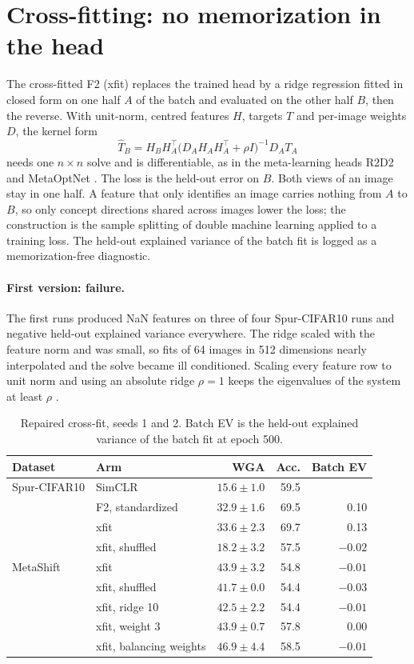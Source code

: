 \documentclass{article}
\begin{document}
\section{Cross-fitting: no memorization in the head}
\label{sec:xfit}

The cross-fitted F2 (xfit) replaces the trained head by a ridge regression fitted in closed form on one
half $A$ of the batch and evaluated on the other half $B$, then the reverse. With unit-norm, centred
features $H$, targets $T$ and per-image weights $D$, the kernel form
\begin{equation}
\hat T_B = H_B H_A^\top \bigl(D_A H_A H_A^\top+\rho I\bigr)^{-1} D_A T_A
\end{equation}
needs one $n\times n$ solve and is differentiable, as in the meta-learning heads R2D2
\citep{bertinetto2019r2d2} and MetaOptNet \citep{lee2019metaoptnet}. The loss is the held-out error on
$B$. Both views of an image stay in one half. A feature that only identifies an image carries nothing
from $A$ to $B$, so only concept directions shared across images lower the loss; the construction is
the sample splitting of double machine learning \citep{chernozhukov2018dml} applied to a training loss.
The held-out explained variance of the batch fit is logged as a memorization-free diagnostic.

\paragraph{First version: failure.} The first runs produced NaN features on three of four Spur-CIFAR10
runs and negative held-out explained variance everywhere. The ridge scaled with the feature norm and was
small, so fits of 64 images in 512 dimensions nearly interpolated and the solve became ill conditioned.
Scaling every feature row to unit norm and using an absolute ridge $\rho=1$ keeps the eigenvalues of
the system at least $\rho$ \citep{hoerl1970ridge}.

\begin{table}[h]
\centering
\caption{Repaired cross-fit, seeds 1 and 2. Batch EV is the held-out explained variance of the batch fit
at epoch 500.}
\label{tab:xfit}
\small
\begin{tabular}{l l r r r}
\toprule
Dataset & Arm & WGA & Acc. & Batch EV \\
\midrule
Spur-CIFAR10 & SimCLR & $15.6\pm1.0$ & 59.5 & \\
 & F2, standardized & $32.9\pm1.6$ & 69.5 & 0.10 \\
 & xfit & $33.6\pm2.3$ & 69.7 & 0.13 \\
 & xfit, shuffled & $18.2\pm3.2$ & 57.5 & $-0.02$ \\
\midrule
MetaShift & xfit & $43.9\pm3.2$ & 54.8 & $-0.01$ \\
 & xfit, shuffled & $41.7\pm0.0$ & 54.4 & $-0.03$ \\
 & xfit, ridge 10 & $42.5\pm2.2$ & 54.4 & $-0.01$ \\
 & xfit, weight 3 & $43.9\pm0.7$ & 57.8 & $0.00$ \\
 & xfit, balancing weights & $46.9\pm4.4$ & 58.5 & $-0.01$ \\
\bottomrule
\end{tabular}
\end{table}
\end{document}

